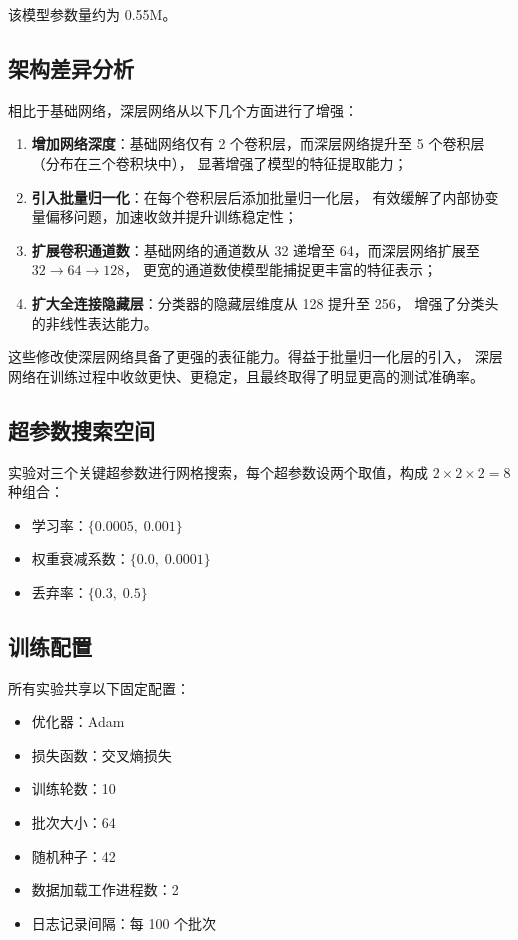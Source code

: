 \documentclass[UTF8,a4paper,12pt]{ctexart}
\begin{document}
该模型参数量约为 0.55M。

\subsection{架构差异分析}

相比于基础网络，深层网络从以下几个方面进行了增强：

\begin{enumerate}
    \item \textbf{增加网络深度}：基础网络仅有 2 个卷积层，而深层网络提升至 5 个卷积层（分布在三个卷积块中），
          显著增强了模型的特征提取能力；
    \item \textbf{引入批量归一化}：在每个卷积层后添加批量归一化层，
          有效缓解了内部协变量偏移问题，加速收敛并提升训练稳定性；
    \item \textbf{扩展卷积通道数}：基础网络的通道数从 32 递增至 64，而深层网络扩展至 $32 \to 64 \to 128$，
          更宽的通道数使模型能捕捉更丰富的特征表示；
    \item \textbf{扩大全连接隐藏层}：分类器的隐藏层维度从 128 提升至 256，
          增强了分类头的非线性表达能力。
\end{enumerate}

这些修改使深层网络具备了更强的表征能力。得益于批量归一化层的引入，
深层网络在训练过程中收敛更快、更稳定，且最终取得了明显更高的测试准确率。

\subsection{超参数搜索空间}

实验对三个关键超参数进行网格搜索，每个超参数设两个取值，构成 $2\times2\times2=8$ 种组合：

\begin{itemize}
    \item 学习率：$\{0.0005,\; 0.001\}$
    \item 权重衰减系数：$\{0.0,\; 0.0001\}$
    \item 丢弃率：$\{0.3,\; 0.5\}$
\end{itemize}

\subsection{训练配置}

所有实验共享以下固定配置：

\begin{itemize}
    \item 优化器：Adam
    \item 损失函数：交叉熵损失
    \item 训练轮数：10
    \item 批次大小：64
    \item 随机种子：42
    \item 数据加载工作进程数：2
    \item 日志记录间隔：每 100 个批次
\end{itemize}
\end{document}
